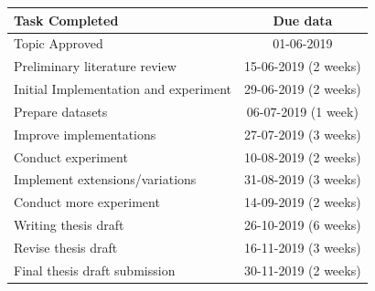 \documentclass[runningheads]{llncs}
\begin{document}
	\begin{table}
		\centering
		\begin{tabular}{| l | c | }
			\hline
			Task Completed & Due data\\
			\hline
			Topic Approved & 01-06-2019  \\
			Preliminary literature review & 15-06-2019 (2 weeks) \\
			Initial Implementation and experiment & 29-06-2019 (2 weeks) \\
			Prepare datasets & 06-07-2019  (1 week) \\
			Improve implementations & 27-07-2019 (3 weeks) \\
			Conduct experiment & 10-08-2019 (2 weeks) \\
			Implement extensions/variations & 31-08-2019 (3 weeks) \\
			Conduct more experiment & 14-09-2019 (2 weeks) \\
			Writing thesis draft & 26-10-2019 (6 weeks) \\
			Revise thesis draft & 16-11-2019 (3 weeks) \\
			Final thesis draft submission & 30-11-2019 (2 weeks) \\
			\hline
		\end{tabular}
		
	\end{table}
	
	

	\newpage
	
	
	
	
\end{document}
